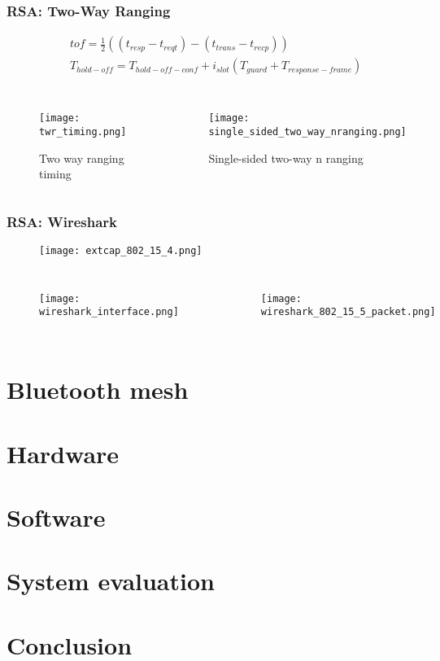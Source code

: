 \documentclass[10pt]{beamer}
\begin{document}
\begin{frame}
    \frametitle{RSA: Two-Way Ranging}
    \begin{equation*}
        \begin{split}
            & tof = \frac{1}{2} ((t_{resp} - t_{reqt}) - (t_{trans} - t_{recp})) \\
            & T_{hold-off} = T_{hold-off-conf} + i_{slot}(T_{guard} + T_{response-frame})
        \end{split}
    \end{equation*}
    \begin{columns}
        \begin{figure}[H]
            \centering
            \texttt{[image: twr\_timing.png]}
            \caption{Two way ranging timing}
        \end{figure}
        \begin{figure}[H]
            \centering
            \texttt{[image: single\_sided\_two\_way\_nranging.png]}
        \caption{Single-sided two-way n ranging}
        \end{figure}
    \end{columns}
\end{frame}

\begin{frame}
    \frametitle{RSA: Wireshark}
    \begin{figure}[H]
        \centering
        \texttt{[image: extcap\_802\_15\_4.png]}
    \end{figure}
    \begin{columns}
        \begin{figure}[H]
            \centering
            \texttt{[image: wireshark\_interface.png]}
        \end{figure}
        \begin{figure}[H]
            \texttt{[image: wireshark\_802\_15\_5\_packet.png]}
        \end{figure}
    \end{columns}
\end{frame}


\section{Bluetooth mesh}

\section{Hardware}

\section{Software}

\section{System evaluation}

\section{Conclusion}
\end{document}
